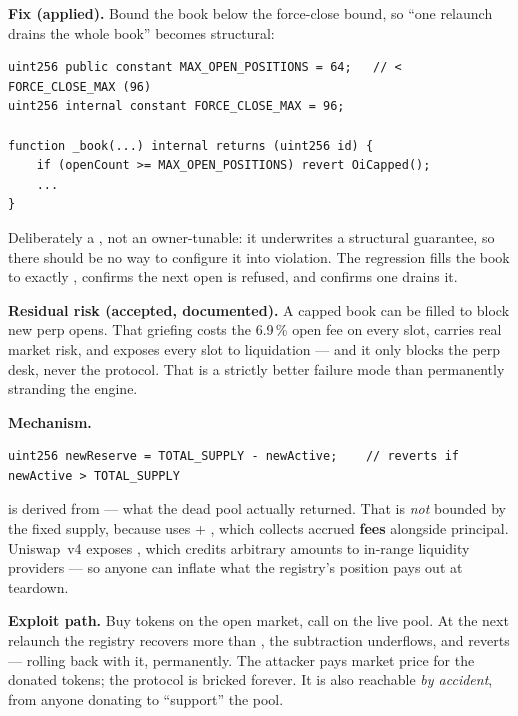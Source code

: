 \textbf{Fix (applied).} Bound the book below the force-close bound, so ``one
relaunch drains the whole book'' becomes structural:

\begin{lstlisting}[numbers=none]
uint256 public constant MAX_OPEN_POSITIONS = 64;   // < FORCE_CLOSE_MAX (96)
uint256 internal constant FORCE_CLOSE_MAX = 96;

function _book(...) internal returns (uint256 id) {
    if (openCount >= MAX_OPEN_POSITIONS) revert OiCapped();
    ...
}
\end{lstlisting}

\noindent Deliberately a , not an owner-tunable: it underwrites a
structural guarantee, so there should be no way to configure it into violation.
The regression fills the book to exactly , confirms
the next open is refused, and confirms one  drains it.

\textbf{Residual risk (accepted, documented).} A capped book can be filled to
block new perp opens. That griefing costs the 6.9\,\% open fee on every slot,
carries real market risk, and exposes every slot to liquidation --- and it only
blocks the perp desk, never the protocol. That is a strictly better failure mode
than permanently stranding the engine.



\textbf{Mechanism.}

\begin{lstlisting}[firstnumber=721]
uint256 newReserve = TOTAL_SUPPLY - newActive;    // reverts if newActive > TOTAL_SUPPLY
\end{lstlisting}

 is derived from  --- what the dead pool
actually returned. That is \emph{not} bounded by the fixed supply, because
 uses  + ,
which collects accrued \textbf{fees} alongside principal. Uniswap~v4 exposes
, which credits arbitrary amounts to in-range
liquidity providers --- so anyone can inflate what the registry's position pays
out at teardown.

\textbf{Exploit path.} Buy tokens on the open market, call  on the
live pool. At the next relaunch the registry recovers more than
, the subtraction underflows, and  reverts
--- rolling back  with it, permanently. The attacker pays
market price for the donated tokens; the protocol is bricked forever. It is also
reachable \emph{by accident}, from anyone donating to ``support'' the pool.

